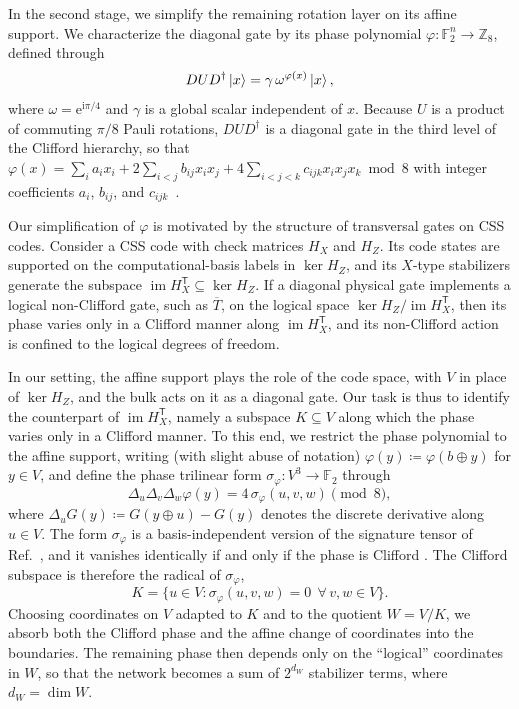 \documentclass[aps,prx,twocolumn,superscriptaddress,longbibliography]{revtex4-2}
\newcommand{\F}{\mathbb F_2}
\newcommand{\im}{\operatorname{im}}
\begin{document}
In the second stage, we simplify the remaining rotation layer on its affine support. 
We characterize the diagonal gate by its phase polynomial $\varphi:\F^n\to\mathbb{Z}_8$, defined through
\begin{equation}
 DUD^\dagger\ket{x}=\gamma\,\omega^{\varphi(x)}\ket{x},
\end{equation}
where $\omega=\mathrm{e}^{\mathrm{i}\pi/4}$ and $\gamma$ is a global scalar independent of $x$. 
Because $U$ is a product of commuting $\pi/8$ Pauli rotations, 
$DUD^\dagger$ is a diagonal gate in the third level of the Clifford hierarchy, 
so that $\varphi(x)=\sum_i a_ix_i+2\sum_{i<j}b_{ij}x_ix_j+4\sum_{i<j<k}c_{ijk}x_ix_jx_k \bmod 8$ 
with integer coefficients $a_i$, $b_{ij}$, and $c_{ijk}$~\cite{cuiDiagonalGatesClifford2017}.

Our simplification of $\varphi$ is motivated by the structure of transversal gates on CSS codes. 
Consider a CSS code with check matrices $H_X$ and $H_Z$. 
Its code states are supported on the computational-basis labels in $\ker H_Z$, 
and its $X$-type stabilizers generate the subspace $\im H_X^{\mathsf T}\subseteq\ker H_Z$. 
If a diagonal physical gate implements a logical non-Clifford gate, such as $\overline{T}$, 
on the logical space $\ker H_Z/\im H_X^{\mathsf T}$, 
then its phase varies only in a Clifford manner along $\im H_X^{\mathsf T}$, 
and its non-Clifford action is confined to the logical degrees of freedom.

In our setting, the affine support plays the role of the code space, 
with $V$ in place of $\ker H_Z$, and the bulk acts on it as a diagonal gate. 
Our task is thus to identify the counterpart of $\im H_X^{\mathsf T}$, 
namely a subspace $K\subseteq V$ along which the phase varies only in a Clifford manner. 
To this end, we restrict the phase polynomial to the affine support, 
writing (with slight abuse of notation) $\varphi(y)\coloneqq\varphi(b\oplus y)$ for $y\in V$, 
and define the phase trilinear form $\sigma_\varphi:V^3\to\F$ through
\begin{equation}
 \Delta_u\Delta_v\Delta_w\varphi(y)=4\,\sigma_\varphi(u,v,w)\pmod 8,
 \label{eq:phase-trilinear}
\end{equation}
where $\Delta_u G(y)\coloneqq G(y\oplus u)-G(y)$ denotes the discrete derivative along $u\in V$. 
The form $\sigma_\varphi$ is a basis-independent version of the signature tensor 
of Ref.~\cite{heyfronEfficientQuantumCompiler2018}, 
and it vanishes identically if and only if the phase is Clifford 
\cite{cuiDiagonalGatesClifford2017,heyfronEfficientQuantumCompiler2018}. 
The Clifford subspace is therefore the radical of $\sigma_\varphi$,
\begin{equation}
 K=\{u\in V:\sigma_\varphi(u,v,w)=0\ \ \forall\, v,w\in V\}.
\end{equation}
Choosing coordinates on $V$ adapted to $K$ and to the quotient $W=V/K$, 
we absorb both the Clifford phase and the affine change of coordinates into the boundaries. 
The remaining phase then depends only on the ``logical'' coordinates in $W$, 
so that the network becomes a sum of $2^{d_W}$ stabilizer terms, where $d_W=\dim W$.
\end{document}
